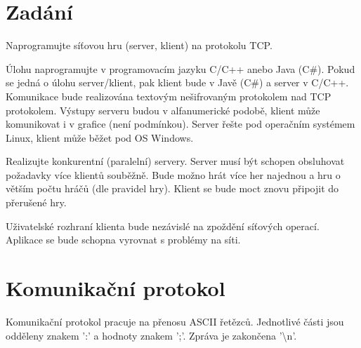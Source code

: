 \setlength{\parskip}{1em}

\chapter{Zadání}
Naprogramujte síťovou hru (server, klient) na protokolu TCP.

Úlohu naprogramujte v programovacím jazyku C/C++ anebo Java (C\#). Pokud se jedná o úlohu server/klient, pak klient bude v Javě (C\#) a server v C/C++. Komunikace bude realizována textovým nešifrovaným protokolem nad TCP protokolem. Výstupy serveru budou v alfanumerické podobě, klient může komunikovat i v grafice (není podmínkou). Server řešte pod operačním systémem Linux, klient může běžet pod OS Windows.

Realizujte konkurentní (paralelní) servery. Server musí být schopen obsluhovat požadavky více klientů souběžně. Bude možno hrát více her najednou a hru o větším počtu hráčů (dle pravidel hry). Klient se bude moct znovu připojit do přerušené hry.

Uživatelské rozhraní klienta bude nezávislé na zpoždění síťových operací. Aplikace se bude schopna vyrovnat s problémy na síti.


\chapter{Komunikační protokol}
Komunikační protokol pracuje na přenosu ASCII řetězců. Jednotlivé části jsou odděleny znakem ':' a hodnoty znakem ';'. Zpráva je zakončena '\textbackslash{n}'.

